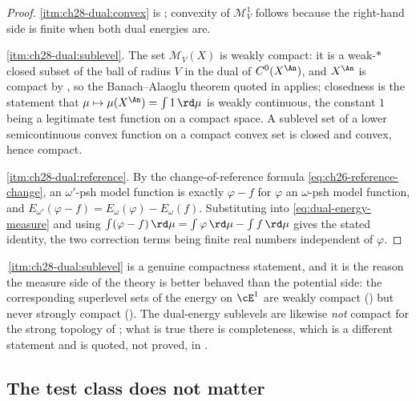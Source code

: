 \begin{proof}
\cref{itm:ch28-dual:convex} is ; convexity
of $\mathcal M^1_V$ follows because the right-hand side is finite when
both dual energies are.

\cref{itm:ch28-dual:sublevel}.  The set $\mathcal M_V(X)$ is weakly compact:
it is a weak-$*$ closed subset of the ball of radius $V$ in the dual of
$C^0(X^{\An})$, and $X^{\An}$ is compact by
, so the Banach--Alaoglu theorem quoted
in  applies; closedness is the statement that
$\mu\mapsto\mu(X^{\An})=\int 1\,\rd\mu$ is weakly continuous, the constant
$1$ being a legitimate test function on a compact space.  A sublevel set of
a lower semicontinuous convex function on a compact convex set is closed and
convex, hence compact.

\cref{itm:ch28-dual:reference}.  By the change-of-reference formula
\eqref{eq:ch26-reference-change}, an $\omega'$-psh model function is
exactly $\varphi-f$ for $\varphi$ an $\omega$-psh model function, and
$E_{\omega'}(\varphi-f)=E_\omega(\varphi)-E_\omega(f)$.  Substituting into
\eqref{eq:dual-energy-measure} and using
$\int(\varphi-f)\,\rd\mu=\int\varphi\,\rd\mu-\int f\,\rd\mu$ gives the
stated identity, the two correction terms being finite real numbers
independent of $\varphi$.
\end{proof}

\begin{remark}
\label{rem:ch28-weak-not-strong}
\,\cref{itm:ch28-dual:sublevel} is a genuine
compactness statement, and it is the reason the measure side of the theory
is better behaved than the potential side: the corresponding superlevel sets
of the energy on $\cE^1$ are weakly compact
() but never strongly compact
().  The dual-energy sublevels are
likewise \emph{not} compact for the strong topology of
; what is true there is completeness, which is
a different statement and is quoted, not proved, in
.
\end{remark}

\subsection{The test class does not matter}
\label{sec:ch28-test-class}

